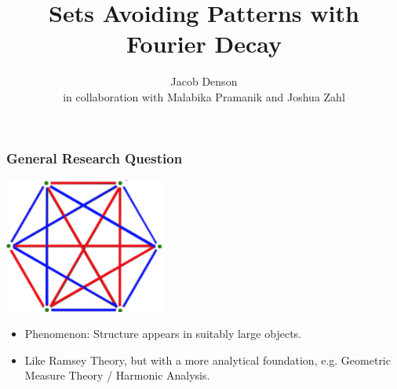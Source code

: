 \documentclass[usenames,dvipsnames,handout]{beamer}
\title{Sets Avoiding Patterns with Fourier Decay}
\author{Jacob Denson\\ \footnotesize in collaboration with Malabika Pramanik and Joshua Zahl}
\institute{}
\begin{document}
\maketitle




\begin{frame}
    \frametitle{General Research Question}

    \begin{center}
    \includegraphics[width=0.4\textwidth]{../Images/RamseyTheory}
    \end{center}

    \begin{itemize}
        \item Phenomenon: Structure appears in suitably large objects.

        \item Like Ramsey Theory, but with a more analytical foundation, e.g. Geometric Measure Theory / Harmonic Analysis.
    \end{itemize}
\end{frame}
\end{document}
